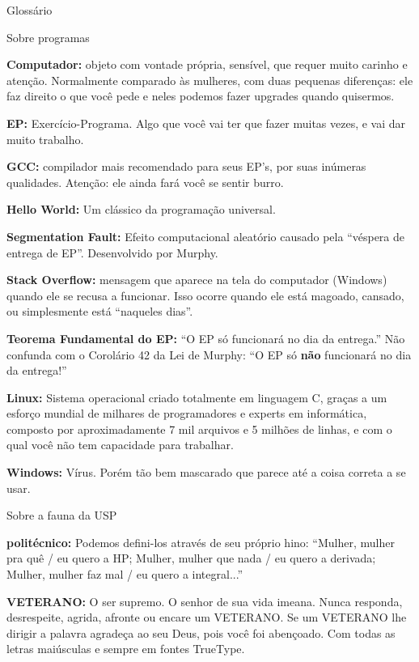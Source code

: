 \begin{secao}{Glossário}
\begin{subsecao}{Sobre programas}

{\bf Computador:} objeto com vontade própria, sensível, que requer muito
carinho e atenção. Normalmente comparado às mulheres, com duas pequenas
diferenças: ele faz direito o que você pede e neles podemos fazer upgrades
quando quisermos.

{\bf EP:} Exercício-Programa. Algo que você vai ter que fazer muitas vezes, e
vai dar muito trabalho.

{\bf GCC:} compilador mais recomendado para seus EP's, por suas inúmeras
qualidades. Atenção: ele ainda fará você se sentir burro.

{\bf Hello World:} Um clássico da programação universal.

{\bf Segmentation Fault:} Efeito computacional aleatório causado pela ``véspera
de entrega de EP''. Desenvolvido por Murphy.

{\bf Stack Overflow:} mensagem que aparece na tela do computador (Windows)
quando ele se recusa a funcionar. Isso ocorre quando ele está magoado, cansado,
ou simplesmente está ``naqueles dias''.

{\bf Teorema Fundamental do EP:} ``O EP só funcionará no dia da entrega.'' Não
confunda com o Corolário 42 da Lei de Murphy: ``O EP só {\bf não} funcionará no
dia da entrega!''

{\bf Linux:} Sistema operacional criado totalmente em linguagem C, graças a um
esforço mundial de milhares de programadores e experts em informática, composto
por aproximadamente 7 mil arquivos e 5 milhões de linhas, e com o qual você não
tem capacidade para trabalhar.

{\bf Windows:} Vírus. Porém tão bem mascarado que parece até a coisa correta a
se usar.
\end{subsecao}

\begin{subsecao}{Sobre a fauna da USP}

{\bf politécnico:} Podemos defini-los através de seu próprio hino: ``Mulher,
mulher pra quê / eu quero a HP; Mulher, mulher que nada / eu quero a derivada;
Mulher, mulher faz mal / eu quero a integral...''

{\bf VETERANO:} O ser supremo. O senhor de sua vida imeana. Nunca responda,
desrespeite, agrida, afronte ou encare um VETERANO. Se um VETERANO lhe dirigir
a palavra agradeça ao seu Deus, pois você foi abençoado. Com todas as letras
maiúsculas e sempre em fontes TrueType.


\end{subsecao}
\end{secao}
